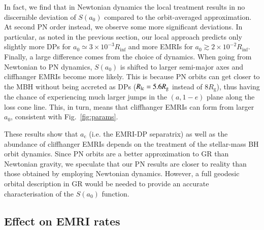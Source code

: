 \documentclass[desactivate]{aa}
\begin{document}
        In fact, we find that in Newtonian dynamics the local treatment results in no discernible deviation of $S(a_0)$ compared to the orbit-averaged approximation. At second PN order instead, we observe some more significant deviations. In particular, as noted in the previous section, our local approach predicts only slightly more DPs for $a_0 \simeq 3\times 10^{-3} R_\mathrm{inf}$ and more EMRIs for $a_0 \gtrsim 2\times10^{-2} R_\mathrm{inf}$.
        Finally, a large difference comes from the choice of dynamics. When going from Newtonian to PN dynamics, $S(a_0)$ is shifted to larger semi-major axes and cliffhanger EMRIs become more likely. This is because PN orbits can get closer to the MBH without being accreted as DPs ($R_{\rm lc}=5.6R_\mathrm{g}$ instead of $8R_\mathrm{g}$), thus having the chance of experiencing much larger jumps in the $(a, 1-e)$ plane along the loss cone line. This, in turn, means that cliffhanger EMRIs can form from larger $a_0$, consistent with Fig.\ \ref{fig:params}. 
        
        These results show that $a_\mathrm{c}$ (i.e. the EMRI-DP separatrix) as well as the abundance of cliffhanger EMRIs depends on the treatment of the stellar-mass BH orbit dynamics. Since PN orbits are a better approximation to GR than Newtonian gravity, we speculate that our PN results are closer to reality than those obtained by employing Newtonian dynamics. However, a full geodesic orbital description in GR would be needed to provide an accurate characterisation of the $S(a_0)$ function.

    \subsection{Effect on EMRI rates}
    
\end{document}
